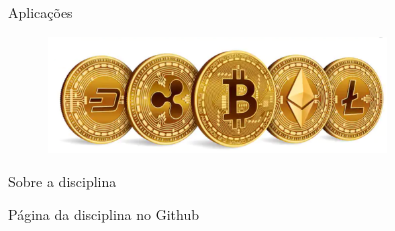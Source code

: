 \documentclass[compress]{beamer}
\begin{document}
\begin{frame}{Aplicações}
\begin{figure}
\begin{overprint}
    \centering\includegraphics[width=0.80\textwidth]{images/blockchain.png}
    \end{overprint}
\end{figure}

\end{frame}

\begin{frame}{Sobre a disciplina}

Página da disciplina no Github \href{https://github.com/iagoac/dce540}{}
\end{frame}
\end{document}
